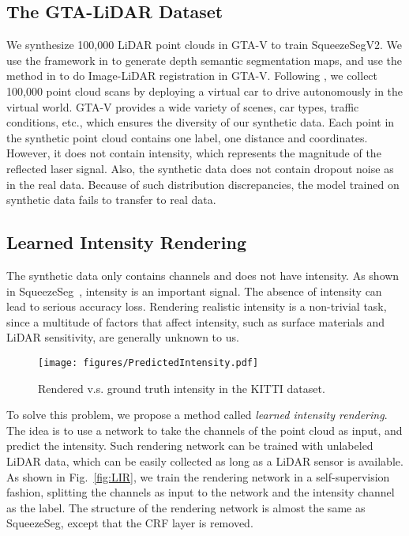 \documentclass[letterpaper, 10 pt, conference]{ieeeconf}
\begin{document}
\subsection{The GTA-LiDAR Dataset}
\label{ssec:GTA-LiDAR}
We synthesize 100,000 LiDAR point clouds in GTA-V to train SqueezeSegV2. We use the framework in \cite{philip2018free} to generate depth semantic segmentation maps, and use the method in \cite{yue2018lidar} to do Image-LiDAR registration in GTA-V. Following \cite{yue2018lidar}, we collect 100,000 point cloud scans by deploying a virtual car to drive autonomously in the virtual world. GTA-V provides a wide variety of scenes, car types, traffic conditions, etc., which ensures the diversity of our synthetic data. Each point in the synthetic point cloud contains one label, one distance and  coordinates. However, it does not contain intensity, which represents the magnitude of the reflected laser signal. Also, the synthetic data does not contain dropout noise as in the real data. Because of such distribution discrepancies, the model trained on synthetic data fails to transfer to real data.


\subsection{Learned Intensity Rendering}
\label{ssec:Intensity}
The synthetic data only contains  channels and does not have intensity. As shown in SqueezeSeg~\cite{wu2017squeezeseg}, intensity is an important signal. The absence of intensity can lead to serious accuracy loss. Rendering realistic intensity is a non-trivial task, since a multitude of factors that affect intensity, such as surface materials and LiDAR sensitivity, are generally unknown to us.



\begin{figure*}[!t]
\begin{center}
\centering \texttt{[image: figures/PredictedIntensity.pdf]}
\caption{Rendered v.s. ground truth intensity in the KITTI dataset.}
\vspace{-10pt}
\label{fig:PredictedIntensity}
\end{center}
\end{figure*}



To solve this problem, we propose a method called \textit{learned intensity rendering}. The idea is to use a network to take the  channels of the point cloud as input, and predict the intensity. Such rendering network can be trained with unlabeled LiDAR data, which can be easily collected as long as a LiDAR sensor is available. As shown in Fig.~\ref{fig:LIR}, we train the rendering network in a self-supervision fashion, splitting the  channels as input to the network and the intensity channel as the label. The structure of the rendering network is almost the same as SqueezeSeg, except that the CRF layer is removed. 
\end{document}
